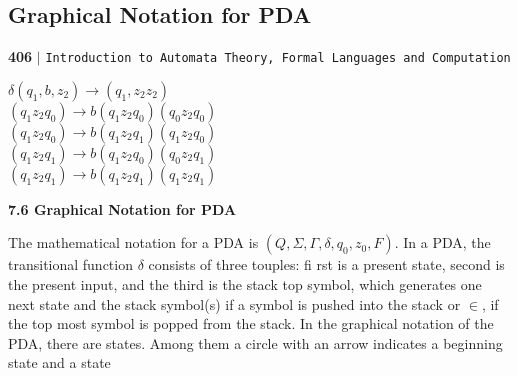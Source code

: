 \documentclass[9pt]{beamer}
\begin{document}
\begin{frame}
\section*{Graphical Notation for PDA}
\begin{flushleft}
    \textbf{406}\hspace*{0.1cm} \textbf{$|$} \hspace*{0.1cm} \texttt{Introduction to Automata Theory, Formal Languages and Computation}
  \end{flushleft}

\vspace*{0.5cm}
\begin{center}
$\delta(q_1, b, z_2) \rightarrow (q_1, z_2z_2)$ \\
 \hspace*{2cm} $(q_1 z_2 q_0) \rightarrow b(q_1 z_2 q_0) (q_0 z_2 q_0)$ \\
 \hspace*{2cm} $(q_1  z_2 q_0) \rightarrow b(q_1 z_2 q_1) (q_1 z_2 q_0)$ \\
 \hspace*{2cm} $(q_1 z_2 q_1) \rightarrow b(q_1 z_2 q_0) (q_0 z_2 q_1)$ \\
 \hspace*{2cm} $(q_1 z_2 q_1) \rightarrow b(q_1 z_2 q_1) (q_1 z_2 q_1)$ \\
\end{center}

\vspace*{0.3cm}

\large{
\textbf{7.6 Graphical Notation for PDA}\\
}

\small{The mathematical notation for a PDA is $(Q, \Sigma, \Gamma, \delta, q_0, z_0, F)$. In a PDA, the transitional function $\delta$
consists of three touples: fi rst is a present state, second is the present input, and the third is the stack top
symbol, which generates one next state and the stack symbol(s) if a symbol is pushed into the stack or
$\in$, if the top most symbol is popped from the stack.
In the graphical notation of the PDA, there are states. Among them a circle with an arrow indicates a
beginning state and a state}
\end{frame}
\end{document}
